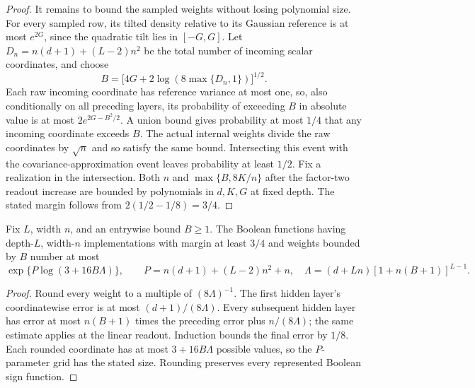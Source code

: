 \begin{proof}
It remains to bound the sampled weights without losing polynomial size.
For every sampled row, its tilted density relative to its Gaussian reference
is at most $e^{2G}$, since the quadratic tilt lies in $[-G,G]$.
Let $D_n=n(d+1)+(L-2)n^2$ be the total number of incoming scalar coordinates,
and choose
\[
 B=\bigl[4G+2\log(8\max\{D_n,1\})\bigr]^{1/2}.
\]
Each raw incoming coordinate has reference variance at most one, so, also
conditionally on all preceding layers, its probability of exceeding $B$ in
absolute value is at most $2e^{2G-B^2/2}$.
A union bound gives probability at most $1/4$ that any incoming coordinate
exceeds $B$. The actual internal weights divide the raw coordinates by
$\sqrt n$ and so satisfy the same bound. Intersecting this event with the
covariance-approximation event leaves probability at least $1/2$.
Fix a realization in the intersection. Both $n$ and
$\max\{B,8K/n\}$ after the factor-two readout increase are bounded by
polynomials in $d,K,G$ at fixed depth. The stated margin follows from
$2(1/2-1/8)=3/4$.
\end{proof}

\begin{lemma}\label{lem:tilt-count}
Fix $L$, width $n$, and an entrywise bound $B\geq1$. The Boolean functions
having depth-$L$, width-$n$ implementations with margin at least $3/4$ and
weights bounded by $B$ number at most
\[
 \exp\{P\log(3+16B\Lambda)\},\qquad
 P=n(d+1)+(L-2)n^2+n,
 \quad \Lambda=(d+Ln)[1+n(B+1)]^{L-1}.
\]
\end{lemma}
\begin{proof}
Round every weight to a multiple of $(8\Lambda)^{-1}$.
The first hidden layer's coordinatewise error is at most $(d+1)/(8\Lambda)$.
Every subsequent hidden layer has error at most $n(B+1)$ times the preceding
error plus $n/(8\Lambda)$; the same estimate applies at the linear readout.
Induction bounds the final error by $1/8$. Each rounded coordinate has at
most $3+16B\Lambda$ possible values, so the $P$-parameter grid has the stated
size. Rounding preserves every represented Boolean sign function.
\end{proof}
